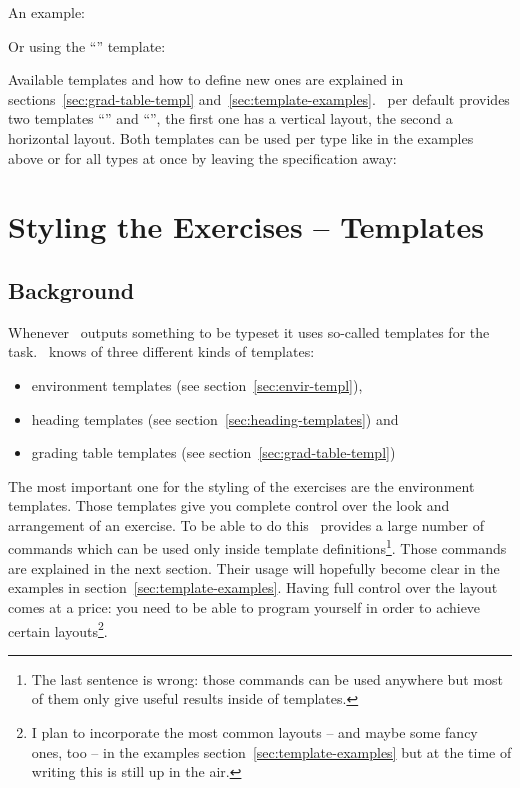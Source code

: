 \documentclass{xsim-manual}
\begin{document}
An example:
\begin{example}
  \gradingtable[type=exercise]
\end{example}

Or using the \enquote{} template:
\begin{example}
  \gradingtable[template=default*,type=exercise]
\end{example}

Available templates and how to define new ones are explained in
sections~\vref{sec:grad-table-templ} and~\vref{sec:template-examples}.  \xsim\
per default provides two templates \enquote{} and
\enquote{}, the first one has a vertical layout, the second a
horizontal layout.  Both templates can be used per type like in the examples
above or for all types at once by leaving the specification \option{type}
away:
\begin{example}
  \gradingtable
\end{example}

\section{Styling the Exercises -- Templates}\label{sec:styl-exerc-templ}

\subsection{Background}
Whenever \xsim\ outputs something to be typeset it uses so-called templates
for the task.  \xsim\ knows of three different kinds of templates:
\begin{itemize}
  \item environment templates (see section~\vref{sec:envir-templ}),
  \item heading templates (see section~\vref{sec:heading-templates}) and
  \item grading table templates (see section~\vref{sec:grad-table-templ})
\end{itemize}

The most important one for the styling of the exercises are the environment
templates.  Those templates give you complete control over the look and
arrangement of an exercise.  To be able to do this \xsim\ provides a large
number of commands which can be used only inside template
definitions\footnote{The last sentence is wrong: those commands can be used
  anywhere but most of them only give useful results inside of templates.}.
Those commands are explained in the next section.  Their usage will hopefully
become clear in the examples in section~\vref{sec:template-examples}. Having
full control over the layout comes at a price: you need to be able to program
yourself in order to achieve certain layouts\footnote{I plan to incorporate
  the most common layouts -- and maybe some fancy ones, too -- in the examples
  section~\vref{sec:template-examples} but at the time of writing this is still
  up in the air.}.
\end{document}
